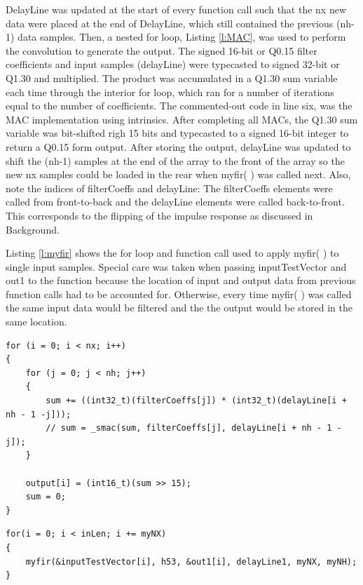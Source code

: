 \documentclass[11pt,pdftex,portrait,letterpaper]{article}
\begin{document}
DelayLine was updated at the start of every function call such that the nx new data were placed at the end of DelayLine, which still contained the previous (nh-1) data samples. Then, a nested for loop, Listing \ref{l:MAC}, was used to perform the convolution to generate the output. The signed 16-bit or Q0.15 filter coefficients and input samples (delayLine) were typecasted to signed 32-bit or Q1.30 and multiplied. The product was accumulated in a Q1.30 sum variable each time through the interior for loop, which ran for a number of iterations equal to the number of coefficients. The commented-out code in line six, was the MAC implementation using intrinsics. After completing all MACs, the Q1.30 sum variable was bit-shifted righ 15 bits and typecasted to a signed 16-bit integer to return a Q0.15 form output. After storing the output, delayLine was updated to shift the (nh-1) samples at the end of the array to the front of the array so the new nx samples could be loaded in the rear when myfir( ) was called next. Also, note the indices of filterCoeffs and delayLine: The filterCoeffs elements were called from front-to-back and the delayLine elements were called back-to-front. This corresponds to the flipping of the impulse response as discussed in Background.

Listing \ref{l:myfir} shows the for loop and function call used to apply myfir( ) to single input samples. Special care was taken when passing inputTestVector and out1 to the function because the location of input and output data from previous function calls had to be accounted for. Otherwise, every time myfir( ) was called the same input data would be filtered and the the output would be stored in the same location.

\begin{lstlisting}[caption={Snippet of code to perform convolution of filter and input data}, label=l:MAC]
for (i = 0; i < nx; i++)
{
	for (j = 0; j < nh; j++)
	{
		sum += ((int32_t)(filterCoeffs[j]) * (int32_t)(delayLine[i + nh - 1 -j]));
		// sum = _smac(sum, filterCoeffs[j], delayLine[i + nh - 1 - j]);
	}

	output[i] = (int16_t)(sum >> 15);
	sum = 0;
}
\end{lstlisting}

\begin{lstlisting}[caption={Snippet of code the myfir( ) funtion call}, label=l:myfir]
 for(i = 0; i < inLen; i += myNX)
{
	myfir(&inputTestVector[i], h53, &out1[i], delayLine1, myNX, myNH);
}
\end{lstlisting}
\end{document}
